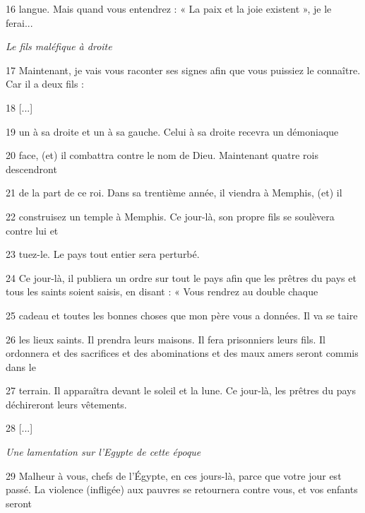 \par 16 langue. Mais quand vous entendrez : « La paix et la joie existent », je le ferai...

\par \textit{Le fils maléfique à droite}

\par 17 Maintenant, je vais vous raconter ses signes afin que vous puissiez le connaître. Car il a deux fils :

\par 18 [...]

\par 19 un à sa droite et un à sa gauche. Celui à sa droite recevra un démoniaque

\par 20 face, (et) il combattra contre le nom de Dieu. Maintenant quatre rois descendront

\par 21 de la part de ce roi. Dans sa trentième année, il viendra à Memphis, (et) il

\par 22 construisez un temple à Memphis. Ce jour-là, son propre fils se soulèvera contre lui et

\par 23 tuez-le. Le pays tout entier sera perturbé.

\par 24 Ce jour-là, il publiera un ordre sur tout le pays afin que les prêtres du pays et tous les saints soient saisis, en disant : « Vous rendrez au double chaque

\par 25 cadeau et toutes les bonnes choses que mon père vous a données. Il va se taire

\par 26 les lieux saints. Il prendra leurs maisons. Il fera prisonniers leurs fils. Il ordonnera et des sacrifices et des abominations et des maux amers seront commis dans le

\par 27 terrain. Il apparaîtra devant le soleil et la lune. Ce jour-là, les prêtres du pays déchireront leurs vêtements.

\par 28 [...]

\par \textit{Une lamentation sur l'Egypte de cette époque}

\par 29 Malheur à vous, chefs de l'Égypte, en ces jours-là, parce que votre jour est passé. La violence (infligée) aux pauvres se retournera contre vous, et vos enfants seront

